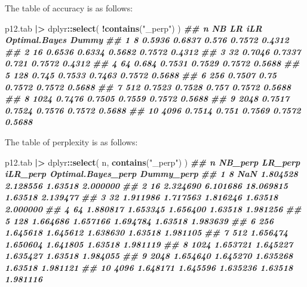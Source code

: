 \documentclass[
]{article}
\newenvironment{Shaded}{\begin{snugshade}}{\end{snugshade}}
\newcommand{\DocumentationTok}[1]{\textcolor[rgb]{0.56,0.35,0.01}{\textbf{\textit{#1}}}}
\newcommand{\FunctionTok}[1]{\textcolor[rgb]{0.13,0.29,0.53}{\textbf{#1}}}
\newcommand{\NormalTok}[1]{#1}
\newcommand{\SpecialCharTok}[1]{\textcolor[rgb]{0.81,0.36,0.00}{\textbf{#1}}}
\newcommand{\StringTok}[1]{\textcolor[rgb]{0.31,0.60,0.02}{#1}}
\begin{document}
The table of accuracy is as follows:

\begin{Shaded}
\begin{Highlighting}[]
\NormalTok{p12.tab }\SpecialCharTok{|\textgreater{}} 
\NormalTok{  dplyr}\SpecialCharTok{::}\FunctionTok{select}\NormalTok{(}
    \SpecialCharTok{!}\FunctionTok{contains}\NormalTok{(}\StringTok{"\_perp"}\NormalTok{)}
\NormalTok{  )}
\DocumentationTok{\#\#       n     NB     LR    iLR Optimal.Bayes  Dummy}
\DocumentationTok{\#\# 1     8 0.5936 0.6837  0.576        0.7572 0.4312}
\DocumentationTok{\#\# 2    16 0.6536 0.6334 0.5682        0.7572 0.4312}
\DocumentationTok{\#\# 3    32 0.7046 0.7337  0.721        0.7572 0.4312}
\DocumentationTok{\#\# 4    64  0.684 0.7531 0.7529        0.7572 0.5688}
\DocumentationTok{\#\# 5   128  0.745 0.7533 0.7463        0.7572 0.5688}
\DocumentationTok{\#\# 6   256 0.7507   0.75 0.7572        0.7572 0.5688}
\DocumentationTok{\#\# 7   512 0.7523 0.7528  0.757        0.7572 0.5688}
\DocumentationTok{\#\# 8  1024 0.7476 0.7505 0.7559        0.7572 0.5688}
\DocumentationTok{\#\# 9  2048 0.7517 0.7524 0.7576        0.7572 0.5688}
\DocumentationTok{\#\# 10 4096 0.7514  0.751 0.7569        0.7572 0.5688}
\end{Highlighting}
\end{Shaded}

The table of perplexity is as follows:

\begin{Shaded}
\begin{Highlighting}[]
\NormalTok{p12.tab }\SpecialCharTok{|\textgreater{}} 
\NormalTok{  dplyr}\SpecialCharTok{::}\FunctionTok{select}\NormalTok{(}
\NormalTok{    n, }\FunctionTok{contains}\NormalTok{(}\StringTok{"\_perp"}\NormalTok{)}
\NormalTok{  )}
\DocumentationTok{\#\#       n  NB\_perp  LR\_perp  iLR\_perp Optimal.Bayes\_perp Dummy\_perp}
\DocumentationTok{\#\# 1     8      NaN 1.804528  2.128556            1.63518   2.000000}
\DocumentationTok{\#\# 2    16 2.324690 6.101686 18.069815            1.63518   2.139477}
\DocumentationTok{\#\# 3    32 1.911986 1.717563  1.816246            1.63518   2.000000}
\DocumentationTok{\#\# 4    64 1.880817 1.653345  1.656400            1.63518   1.981256}
\DocumentationTok{\#\# 5   128 1.664686 1.657166  1.694784            1.63518   1.983639}
\DocumentationTok{\#\# 6   256 1.645618 1.645612  1.638630            1.63518   1.981105}
\DocumentationTok{\#\# 7   512 1.656474 1.650604  1.641805            1.63518   1.981119}
\DocumentationTok{\#\# 8  1024 1.653721 1.645227  1.635427            1.63518   1.984055}
\DocumentationTok{\#\# 9  2048 1.654640 1.645270  1.635268            1.63518   1.981121}
\DocumentationTok{\#\# 10 4096 1.648171 1.645596  1.635236            1.63518   1.981116}
\end{Highlighting}
\end{Shaded}
\end{document}

